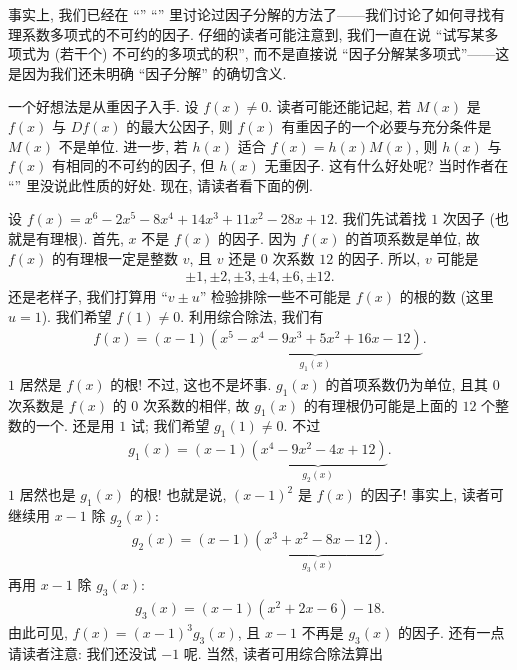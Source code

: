 事实上, 我们已经在 ``\RationalRootsOfPolynomialsOverQ '' ``\FactorsOfHigherDegreeOfPolynomialsOverQ '' 里讨论过因子分解的方法了——我们讨论了如何寻找有理系数多项式的不可约的因子. 仔细的读者可能注意到, 我们一直在说 ``试写某多项式为 (若干个) 不可约的多项式的积'', 而不是直接说 ``因子分解某多项式''——这是因为我们还未明确 ``因子分解'' 的确切含义.

一个好想法是从重因子入手. 设 $f(x) \neq 0$. 读者可能还能记起, 若 $M(x)$ 是 $f(x)$ 与 $Df(x)$ 的最大公因子, 则 $f(x)$ 有重因子的一个必要与充分条件是 $M(x)$ 不是单位. 进一步, 若 $h(x)$ 适合 $f(x) = h(x)M(x)$, 则 $h(x)$ 与 $f(x)$ 有相同的不可约的因子, 但 $h(x)$ 无重因子. 这有什么好处呢? 当时作者在 ``\MultipleFactors '' 里没说此性质的好处. 现在, 请读者看下面的例.

\begin{example}
    设 $f(x) = x^6-2 x^5-8 x^4+14 x^3+11 x^2-28 x+12$. 我们先试着找 $1$ 次因子 (也就是有理根). 首先, $x$ 不是 $f(x)$ 的因子. 因为 $f(x)$ 的首项系数是单位, 故 $f(x)$ 的有理根一定是整数 $v$, 且 $v$ 还是 $0$ 次系数 $12$ 的因子. 所以, $v$ 可能是
    \begin{align*}
        \pm 1, \pm 2, \pm 3, \pm 4, \pm 6, \pm 12.
    \end{align*}
    还是老样子, 我们打算用 ``$v \pm u$'' 检验排除一些不可能是 $f(x)$ 的根的数 (这里 $u = 1$). 我们希望 $f(1) \neq 0$. 利用综合除法, 我们有
    \begin{align*}
        f(x) = (x - 1) \underbrace{(x^5-x^4-9 x^3+5 x^2+16 x-12)}_{g_1 (x)}.
    \end{align*}
    $1$ 居然是 $f(x)$ 的根! 不过, 这也不是坏事. $g_1 (x)$ 的首项系数仍为单位, 且其 $0$ 次系数是 $f(x)$ 的 $0$ 次系数的相伴, 故 $g_1 (x)$ 的有理根仍可能是上面的 $12$ 个整数的一个. 还是用 $1$ 试; 我们希望 $g_1 (1) \neq 0$. 不过
    \begin{align*}
        g_1 (x) = (x - 1) \underbrace{(x^4-9 x^2-4 x+12)}_{g_2 (x)}.
    \end{align*}
    $1$ 居然也是 $g_1 (x)$ 的根! 也就是说, $(x-1)^2$ 是 $f(x)$ 的因子! 事实上, 读者可继续用 $x-1$ 除 $g_2 (x)$:
    \begin{align*}
        g_2 (x) = (x - 1) \underbrace{(x^3+x^2-8 x-12)}_{g_3 (x)}.
    \end{align*}
    再用 $x-1$ 除 $g_3 (x)$:
    \begin{align*}
        g_3 (x) = (x - 1) (x^2 + 2x - 6) - 18.
    \end{align*}
    由此可见, $f(x) = (x-1)^3 g_3 (x)$, 且 $x-1$ 不再是 $g_3 (x)$ 的因子. 还有一点请读者注意: 我们还没试 $-1$ 呢. 当然, 读者可用综合除法算出

\end{example}
